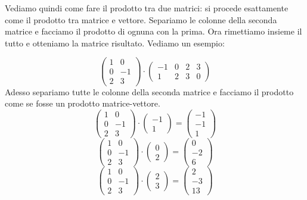 \documentclass{article}     %
\begin{document}
Vediamo quindi come fare il prodotto tra due matrici: si procede esattamente come il prodotto tra matrice e vettore. Separiamo le colonne della seconda matrice e facciamo il prodotto di ognuna con la prima. Ora rimettiamo insieme il tutto e otteniamo la matrice risultato. Vediamo un esempio:
\begin{ex}
    \[\begin{pmatrix} 1&0\\0&- 1\\2&3 \end{pmatrix} \cdot \begin{pmatrix} - 1&0&2&3\\1&2&3&0 \end{pmatrix} \]
    Adesso separiamo tutte le colonne della seconda matrice e facciamo il prodotto come se fosse un prodotto matrice-vettore.
    \[\begin{pmatrix} 1&0\\0&- 1\\2&3 \end{pmatrix} \cdot \begin{pmatrix} - 1\\1 \end{pmatrix} = \begin{pmatrix} - 1\\- 1\\1 \end{pmatrix} \]
    \[\begin{pmatrix} 1&0\\0&- 1\\2&3 \end{pmatrix} \cdot \begin{pmatrix} 0\\2 \end{pmatrix} = \begin{pmatrix} 0\\- 2\\6 \end{pmatrix}\]
    \[\begin{pmatrix} 1&0\\0&- 1\\2&3 \end{pmatrix} \cdot \begin{pmatrix} 2\\3\end{pmatrix} = \begin{pmatrix} 2\\- 3\\ 13 \end{pmatrix}\]

\end{ex}
\end{document}
